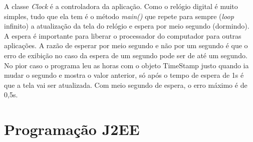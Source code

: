 \documentclass[
	11pt,				%
	openright,
	twoside,			%
	a4paper,			%
	english,			%
	french,
	brazil,				%
	sumario=tradicional
	]{abntex2}
\begin{document}
A classe \emph{Clock} é a controladora da aplicação. Como o relógio digital é muito simples, tudo que ela tem é o método \emph{main()} que repete para sempre (\emph{loop} infinito) a atualização da tela do relógio e espera por meio segundo (dormindo). A espera é importante para liberar o processador do computador para outras aplicações. A razão de esperar por meio segundo e não por um segundo é que o erro de exibição no caso da espera de um segundo pode ser de até um segundo. No pior caso o programa leu as horas com o objeto TimeStamp justo quando ia mudar o segundo e mostra o valor anterior, só após o tempo de espera de 1s é que a tela vai ser atualizada. Com meio segundo de espera, o erro máximo é de 0,5s.

\section{Programação J2EE}


% 

%
%
%

\postextual



%
%
% 



\
\end{document}
